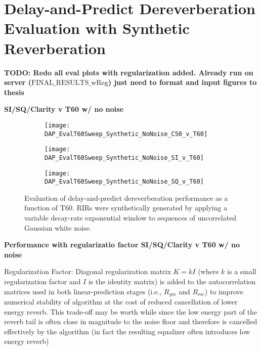 \vfill
\clearpage




\section{Delay-and-Predict Dereverberation Evaluation with Synthetic Reverberation}

\textbf{TODO: Redo all eval plots with regularization added. Already run on server ($\text{FINAL}\_\text{RESULTS}\_\text{wReg}$) just need to format and input figures to thesis}

\textbf{SI/SQ/Clarity v T60 w/ no noise}

\begin{figure}[H]
	\centering
	\begin{subfigure}[b]{0.47\textwidth}
		\centering
		\texttt{[image: DAP\_EvalT60Sweep\_Synthetic\_NoNoise\_C50\_v\_T60]}
	\end{subfigure}
	\begin{subfigure}[b]{0.92\textwidth}
		\centering
		\texttt{[image: DAP\_EvalT60Sweep\_Synthetic\_NoNoise\_SI\_v\_T60]}
	\end{subfigure}
	\begin{subfigure}[b]{0.92\textwidth}
		\centering
		\texttt{[image: DAP\_EvalT60Sweep\_Synthetic\_NoNoise\_SQ\_v\_T60]}
	\end{subfigure}
	\caption{Evaluation of delay-and-predict dereverberation performance as a function of T60. RIRs were synthetically generated by applying a variable decay-rate exponential window to sequences of uncorrelated Gaussian white noise.}
	\label{fig:DAP_EvalT60Sweep_Synthetic_NoNoise}
\end{figure}

\textbf{Performance with regularizatio factor SI/SQ/Clarity v T60 w/ no noise}

Regularization Factor: Diagonal regularization matrix $K=kI$ (where $k$ is a small regularization factor and $I$ is the identity matrix) is added to the autocorrelation matrices used in both linear-prediction stages (i.e., $R_{ym}$ and $R_{mc}$) to improve numerical stability of algorithm at the cost of reduced cancellation of lower energy reverb. This trade-off may be worth while since the low energy part of the reverb tail is often close in magnitude to the noise floor and therefore is cancelled effectively by the algorithm (in fact the resulting equalizer often introduces low energy reverb)

